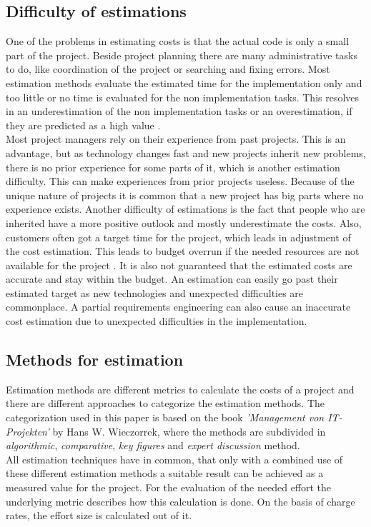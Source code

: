 \subsection{Difficulty of estimations}

One of the problems in estimating costs is that the actual code is only a small part of the project. Beside project planning there are many administrative tasks to do, like coordination of the project or searching and fixing errors. Most estimation methods evaluate the estimated time for the implementation only and too little or no time is evaluated for the non implementation tasks. This resolves in an underestimation of the non implementation tasks or an overestimation, if they are predicted as a high value \cite{itplanung}.
\\
Most project managers rely on their experience from past projects. This is an advantage, but as technology changes fast and new projects inherit new problems, there is no prior experience for some parts of it, which is another estimation difficulty. This can make experiences from prior projects useless. Because of the unique nature of projects it is common that a new project has big parts where no experience exists. Another difficulty of estimations is the fact that people who are inherited have a more positive outlook and mostly underestimate the costs.
Also, customers often got a target time for the project, which leads in adjustment of the cost estimation. This leads to budget overrun if the needed resources are not available for the project \cite{winfwiki}. It is also not guaranteed that the estimated costs are accurate and stay within the budget. An estimation can easily go past their estimated target as new technologies and unexpected difficulties are commonplace. A partial requirements engineering can also cause an inaccurate cost estimation due to unexpected difficulties in the implementation.\\

\subsection{Methods for estimation}\label{chapter:estimationmethods}

Estimation methods are different metrics to calculate the costs of a project and there are different approaches to categorize the estimation methods. The categorization used in this paper is based on the book \textit{'Management von IT-Projekten'} by Hans W. Wieczorrek, where the methods are subdivided in \textit{algorithmic}, \textit{comparative}, \textit{key figures} and \textit{expert discussion} method\cite{itplanung}.\\
All estimation techniques have in common, that only with a combined use of these different estimation methods a suitable result can be achieved as a measured value for the project. For the evaluation of the needed effort the underlying metric describes how this calculation is done. On the basis of charge rates, the effort size is calculated out of it.\\

